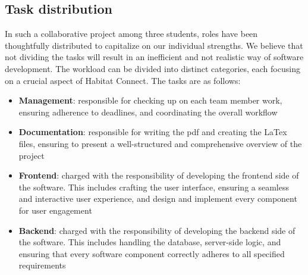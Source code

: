 \documentclass[conference]{IEEEtran}
\begin{document}
\subsection{Task distribution}
In such a collaborative project among three students, roles have been thoughtfully distributed to capitalize on our individual strengths. We believe that not dividing the tasks will result in an inefficient and not realistic way of software development. The workload can be divided into distinct categories, each focusing on a crucial aspect of Habitat Connect. The tasks are as follows:
\begin{itemize}
    \item \textbf{Management}: responsible for checking up on each team member work, ensuring adherence to deadlines, and coordinating the overall workflow
    \item \textbf{Documentation}: responsible for writing the pdf and creating the LaTex files, ensuring to present a well-structured and comprehensive overview of the project
    \item \textbf{Frontend}: charged with the responsibility of developing the frontend side of the software. This includes crafting the user interface, ensuring a seamless and interactive user experience, and design and implement every component for user engagement
    \item \textbf{Backend}: charged with the responsibility of developing the backend side of the software. This includes handling the database, server-side logic, and ensuring that every software component correctly adheres to all specified requirements 
\end{itemize}
\end{document}
